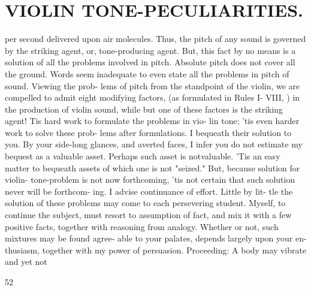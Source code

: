 \documentclass{article}
\begin{document}
\section*{VIOLIN TONE-PECULIARITIES.}
per second delivered upon air molecules. Thus, the pitch of any sound is governed by the striking agent, or, tone-producing agent. But, this fact by no means is a solution of all the problems involved in pitch. Absolute pitch does not cover all the ground. Words seem inadequate to even state all the problems in pitch of sound. Viewing the prob- lems of pitch from the standpoint of the violin, we are compelled to admit eight modifying factors, (as formulated in Rules I- VIII, ) in the production of violin sound, while but one of these factors is the striking agent! Tis hard work to formulate the problems in vio- lin tone; 'tis even harder work to solve these prob- lems after formulations. I bequeath their solution to you. By your side-long glances, and averted faces, I infer you do not estimate my bequest as a valuable asset. Perhaps such asset is notvaluable. 'Tis an easy matter to bequeath assets of which one is not "seized." But, because solution for violin- tone-problem is not now forthcoming, 'tis not certain that such solution never will be forthcom- ing. I advise continuance of effort. Little by lit- tle the solution of these problems may come to each persevering student. Myself, to continue the subject, must resort to assumption of fact, and mix it with a few positive facts, together with reasoning from analogy. Whether or not, such mixtures may be found agree- able to your palates, depends largely upon your en- thusiasm, together with my power of persuasion. Proceeding: A body may vibrate and yet not

52
\end{document}
